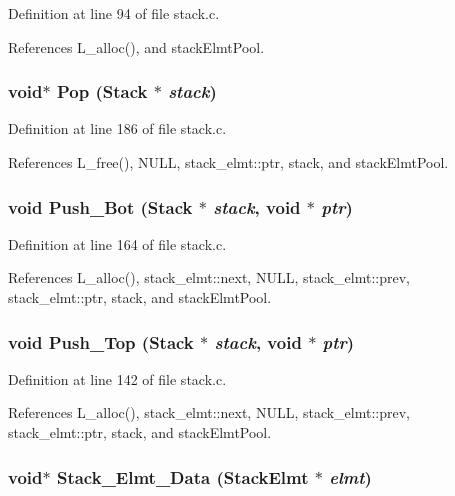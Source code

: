 Definition at line 94 of file stack.c.

References L\_\-alloc(), and stack\-Elmt\-Pool.
\subsubsection{\setlength{\rightskip}{0pt plus 5cm}void$\ast$ Pop (\bf{Stack} $\ast$ {\em stack})}\label{stack_8h_0b3eb53f063ddc4efb6e755860960cf5}




Definition at line 186 of file stack.c.

References L\_\-free(), NULL, stack\_\-elmt::ptr, stack, and stack\-Elmt\-Pool.
\subsubsection{\setlength{\rightskip}{0pt plus 5cm}void Push\_\-Bot (\bf{Stack} $\ast$ {\em stack}, void $\ast$ {\em ptr})}\label{stack_8h_c8216bbaefe6187f1c0e30e598ecb087}




Definition at line 164 of file stack.c.

References L\_\-alloc(), stack\_\-elmt::next, NULL, stack\_\-elmt::prev, stack\_\-elmt::ptr, stack, and stack\-Elmt\-Pool.
\subsubsection{\setlength{\rightskip}{0pt plus 5cm}void Push\_\-Top (\bf{Stack} $\ast$ {\em stack}, void $\ast$ {\em ptr})}\label{stack_8h_1460a4e9e492df3a1a002611c747380d}




Definition at line 142 of file stack.c.

References L\_\-alloc(), stack\_\-elmt::next, NULL, stack\_\-elmt::prev, stack\_\-elmt::ptr, stack, and stack\-Elmt\-Pool.
\subsubsection{\setlength{\rightskip}{0pt plus 5cm}void$\ast$ Stack\_\-Elmt\_\-Data (\bf{Stack\-Elmt} $\ast$ {\em elmt})}\label{stack_8h_0eff362c9d73742195bcd69648d3db91}




